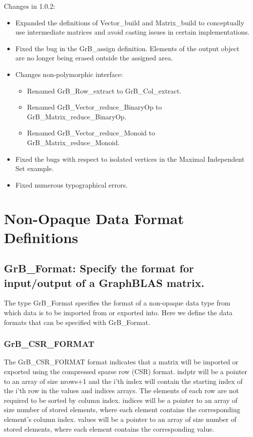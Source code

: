 Changes in 1.0.2:
\begin{itemize}
\item Expanded the definitions of {\sf Vector\_build} and {\sf Matrix\_build} to conceptually use intermediate matrices and avoid casting issues in certain implementations.
\item Fixed the bug in the {\sf GrB\_assign} definition. Elements of the output object are no longer being erased outside the assigned area.
\item Changes non-polymorphic interface:
    \begin{itemize}
    \item Renamed {\sf GrB\_Row\_extract} to {\sf GrB\_Col\_extract}.
    \item Renamed {\sf GrB\_Vector\_reduce\_BinaryOp} to {\sf GrB\_Matrix\_reduce\_BinaryOp}.
    \item Renamed {\sf GrB\_Vector\_reduce\_Monoid} to {\sf GrB\_Matrix\_reduce\_Monoid}.
    \end{itemize}
\item Fixed the bugs with respect to isolated vertices in the Maximal Independent Set example.
\item Fixed numerous typographical errors.
\end{itemize}


\chapter{Non-Opaque Data Format Definitions}
\label{Chp:GrB_Format}

\section{{\sf GrB\_Format}: Specify the format for input/output of a GraphBLAS matrix.}
\label{Sec:GrB_Format}

The type {\sf GrB\_Format} specifies the format of a non-opaque data type from
which data is to be imported from or exported into.  Here we define the
data formats that can be specified with {\sf GrB\_Format}.

\subsection{{\sf GrB\_CSR\_FORMAT}}

The {\sf GrB\_CSR\_FORMAT} format indicates that a matrix will be imported or
exported using the compressed sparse
row (CSR) format.  {\sf indptr} will be a pointer to an array of size nrows+1
and the i'th index will contain the starting index of the i'th row in the {\sf values}
and {\sf indices} arrays.  The elements of each row are not required to be sorted
by column index.
{\sf indices} will be a pointer to an array of size number of
stored elements, where each element contains the corresponding element's column index.
{\sf values} will be a pointer to an array of size number of
stored elements, where each element contains the corresponding value.\\

